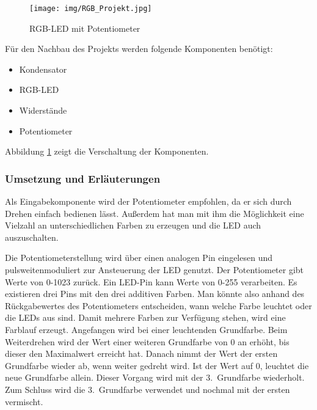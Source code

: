 \begin{figure}[h]
\begin{center}
\texttt{[image: img/RGB\_Projekt.jpg]}
\caption{RGB-LED mit Potentiometer}
\label{rgb_project}
\end{center}
\end{figure}

Für den Nachbau des Projekts werden folgende Komponenten benötigt:
\begin{itemize}
\item{Kondensator}
\item{RGB-LED}
\item{Widerstände}
\item{Potentiometer}
\end{itemize}

Abbildung \ref{rgb_project} zeigt die Verschaltung der Komponenten.
 
\subsubsection{Umsetzung und Erläuterungen}
Als Eingabekomponente wird der Potentiometer empfohlen, da er sich durch Drehen einfach bedienen lässt. Außerdem hat man mit ihm die Möglichkeit eine Vielzahl an unterschiedlichen Farben zu erzeugen und die LED auch auszuschalten.
 
Die Potentiometerstellung wird über einen analogen Pin eingelesen und pulsweitenmoduliert zur Ansteuerung der LED genutzt. Der Potentiometer gibt Werte von 0-1023 zurück. Ein LED-Pin kann Werte von 0-255 verarbeiten. Es existieren drei Pins mit den drei additiven Farben. Man könnte also anhand des Rückgabewertes des Potentiometers entscheiden, wann welche Farbe leuchtet oder die LEDs aus sind. Damit mehrere Farben zur Verfügung stehen, wird eine Farblauf erzeugt. Angefangen wird bei einer leuchtenden Grundfarbe. Beim Weiterdrehen wird der Wert einer weiteren Grundfarbe von 0 an erhöht, bis dieser den Maximalwert erreicht hat. Danach nimmt der Wert der ersten Grundfarbe wieder ab, wenn weiter gedreht wird. Ist der Wert auf 0, leuchtet die neue Grundfarbe allein. Dieser Vorgang wird mit der 3.~Grundfarbe wiederholt. Zum Schluss wird die 3.~Grundfarbe verwendet und nochmal mit der ersten vermischt.


